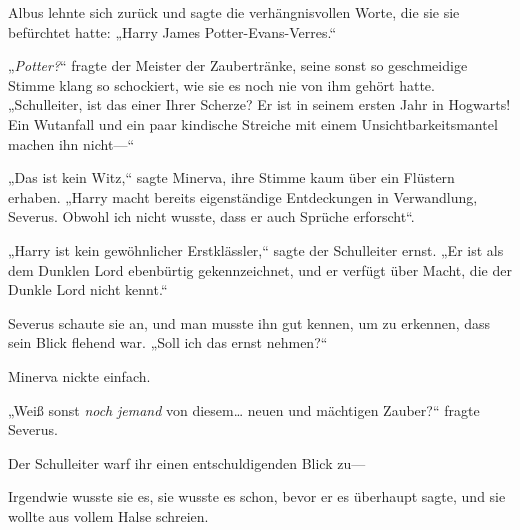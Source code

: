 Albus lehnte sich zurück und sagte die verhängnisvollen Worte, die sie sie befürchtet hatte: „Harry James Potter-Evans-Verres.“

„\emph{Potter?}“ fragte der Meister der Zaubertränke, seine sonst so geschmeidige Stimme klang so schockiert, wie sie es noch nie von ihm gehört hatte. „Schulleiter, ist das einer Ihrer Scherze? Er ist in seinem ersten Jahr in Hogwarts! Ein Wutanfall und ein paar kindische Streiche mit einem Unsichtbarkeitsmantel machen ihn nicht—“

„Das ist kein Witz,“ sagte Minerva, ihre Stimme kaum über ein Flüstern erhaben. „Harry macht bereits eigenständige Entdeckungen in Verwandlung, Severus. Obwohl ich nicht wusste, dass er auch Sprüche erforscht“.

„Harry ist kein gewöhnlicher Erstklässler,“ sagte der Schulleiter ernst. „Er ist als dem Dunklen Lord ebenbürtig gekennzeichnet, und er verfügt über Macht, die der Dunkle Lord nicht kennt.“

Severus schaute sie an, und man musste ihn gut kennen, um zu erkennen, dass sein Blick flehend war. „Soll ich das ernst nehmen?“

Minerva nickte einfach.

„Weiß sonst \emph{noch} \emph{jemand} von diesem… neuen und mächtigen Zauber?“ fragte Severus.

Der Schulleiter warf ihr einen entschuldigenden Blick zu—

Irgendwie wusste sie es, sie wusste es schon, bevor er es überhaupt sagte, und sie wollte aus vollem Halse schreien.

